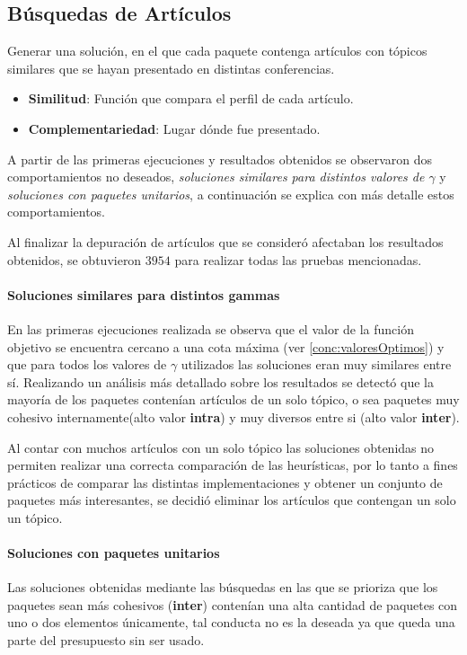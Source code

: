 \subsection{Búsquedas de Artículos}\label{res:busPaper}
Generar una solución, en el que cada paquete contenga artículos con tópicos similares que se hayan presentado en distintas conferencias.
\begin{itemize}
  \item \textbf{Similitud}: Función que compara el perfil de cada artículo.
  \item \textbf{Complementariedad}: Lugar dónde fue presentado.
\end{itemize}

A partir de las primeras ejecuciones y resultados obtenidos se observaron dos comportamientos no deseados, \textit{soluciones similares para distintos valores de $\gamma$} y \textit{soluciones con paquetes unitarios}, a continuación se explica con más detalle estos comportamientos.

Al finalizar la depuración de artículos que se consideró afectaban los resultados obtenidos, se obtuvieron $3954$ para realizar todas las pruebas mencionadas.
\paragraph{Soluciones similares para distintos gammas}
En las primeras ejecuciones realizada se observa que el valor de la función objetivo se encuentra cercano a una cota máxima (ver \ref{conc:valoresOptimos}) y que para todos los valores de $\gamma$ utilizados las soluciones eran muy similares entre sí. Realizando un análisis más detallado sobre los resultados se detectó que la mayoría de los paquetes contenían artículos de un solo tópico, o sea paquetes  muy cohesivo internamente(alto valor \textbf{intra}) y muy diversos entre si (alto valor \textbf{inter}).

Al contar con muchos artículos con un solo tópico las soluciones obtenidas no permiten realizar una correcta comparación de las heurísticas, por lo tanto a fines prácticos de comparar las distintas implementaciones y obtener un conjunto de paquetes más interesantes, se decidió eliminar los artículos que contengan un solo un tópico.
\paragraph{Soluciones con paquetes unitarios}
Las soluciones obtenidas mediante las búsquedas en las que se prioriza que los paquetes sean más cohesivos (\textbf{inter}) contenían una alta cantidad de paquetes con uno o dos elementos únicamente, tal conducta no es la deseada ya que queda una parte del presupuesto sin ser usado.

